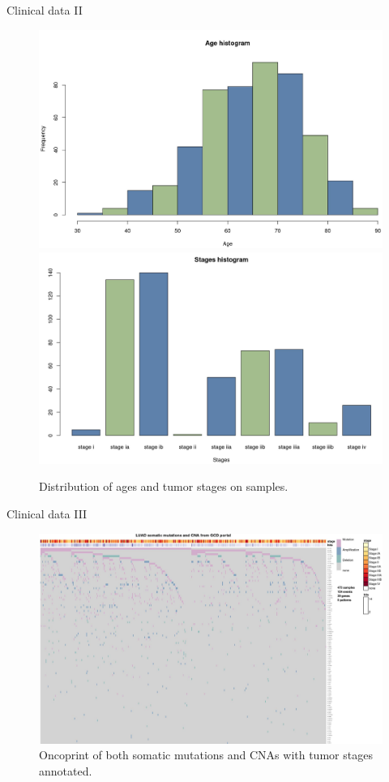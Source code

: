 \documentclass{beamer}
\begin{document}
\begin{frame}{Clinical data II}
  \begin{figure}
    \centering
    \includegraphics[scale = 0.082]{img/ages.jpg}
    \includegraphics[scale = 0.082]{img/stages.jpg}
    \caption{Distribution of ages and tumor stages on samples.}
  \end{figure}
\end{frame}
\begin{frame}{Clinical data III}
  \begin{figure}
    \centering
    \includegraphics[scale = 0.135]{img/stageonco.jpg}
    \caption{Oncoprint of both somatic mutations and CNAs with tumor stages
      annotated.} 
  \end{figure}
\end{frame}
\end{document}
